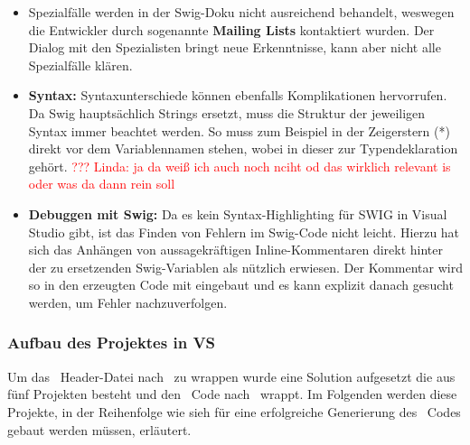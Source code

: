 \begin{itemize}
\begin{itemize}
	\end{itemize}
\item Spezialfälle werden in der Swig-Doku nicht ausreichend behandelt, weswegen die Entwickler durch sogenannte \textbf{Mailing Lists} kontaktiert wurden. Der Dialog mit den Spezialisten bringt neue Erkenntnisse, kann aber nicht alle Spezialfälle klären. %
\item \textbf{Syntax:} Syntaxunterschiede können ebenfalls Komplikationen hervorrufen. Da Swig hauptsächlich Strings ersetzt, muss die Struktur der jeweiligen Syntax immer beachtet werden. So muss zum Beispiel in \CC der Zeigerstern (*) direkt vor dem Variablennamen stehen, wobei in \CS dieser zur Typendeklaration gehört. \textcolor{red}{??? Linda: ja da weiß ich auch noch nciht od das wirklich relevant is oder was da dann rein soll}
\item \textbf{Debuggen mit Swig:} Da es kein Syntax-Highlighting für SWIG in Visual Studio gibt, ist das Finden von Fehlern im Swig-Code nicht leicht. Hierzu hat sich das Anhängen von aussagekräftigen Inline-Kommentaren direkt hinter der zu ersetzenden Swig-Variablen als nützlich erwiesen. Der Kommentar wird so in den erzeugten Code mit eingebaut und es kann explizit danach gesucht werden, um Fehler nachzuverfolgen.
\end{itemize}

\subsubsection{Aufbau des Projektes in VS}\label{subsubsec:Aufbau}

Um das \CC~Header-Datei nach \CS~zu wrappen wurde eine Solution aufgesetzt die aus fünf Projekten besteht und den \CC~Code nach \CS~wrappt. Im Folgenden werden diese Projekte, in der Reihenfolge wie sieh für eine erfolgreiche Generierung des \CS~Codes gebaut werden müssen, erläutert.\\


